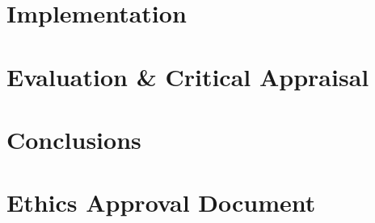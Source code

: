 \documentclass[11pt,openright,twoside,a4paper]{report}
\begin{document}
\chapter{Implementation}
\label{ch:chapter6}


\chapter{Evaluation \& Critical Appraisal}
\label{ch:chapter7}


\chapter{Conclusions}
\label{ch:chapter8}




\let\cleardoublepage\clearpage %
\appendix

\chapter{Ethics Approval Document}
\label{ch:appendix-comparison-programming-languages}

\end{document}

